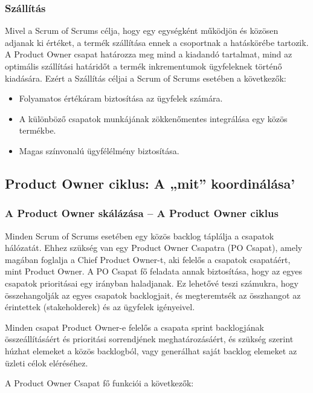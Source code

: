 \documentclass[12pt,a4paper,parskip=full]{scrartcl}
\begin{document}
\subsubsection{Szállítás}\label{Delivery}

Mivel a Scrum of Scrums célja, hogy egy egységként működjön és közösen adjanak ki értéket, a termék szállítása ennek a csoportnak a hatáskörébe tartozik. A Product Owner csapat határozza meg mind a kiadandó tartalmat, mind az optimális szállítási határidőt a termék inkrementumok ügyfeleknek történő kiadására. Ezért a Szállítás céljai a Scrum of Scrums esetében a következők:

\begin{itemize}
\itemsep1pt\parskip0pt
\item
 Folyamatos értékáram biztosítása az ügyfelek számára.
\item
 A különböző csapatok munkájának zökkenőmentes integrálása egy közös termékbe.
\item
 Magas színvonalú ügyfélélmény biztosítása.
\end{itemize}

\subsection{Product Owner ciklus: A „mit” koordinálása'}\label{The-product-owner-cycle}

\subsubsection{A Product Owner skálázása – A Product Owner ciklus}\label{Scaling-the-product-owner}

Minden Scrum of Scrums esetében egy közös backlog táplálja a csapatok hálózatát. Ehhez szükség van egy Product Owner Csapatra (PO Csapat), amely magában foglalja a Chief Product Owner-t, aki felelős a csapatok csapatáért, mint Product Owner. A PO Csapat fő feladata annak biztosítása, hogy az egyes csapatok prioritásai egy irányban haladjanak. Ez lehetővé teszi számukra, hogy összehangolják az egyes csapatok backlogjait, és megteremtsék az összhangot az érintettek (stakeholderek) és az ügyfelek igényeivel.

Minden csapat Product Owner-e felelős a csapata sprint backlogjának összeállításáért és prioritási sorrendjének meghatározásáért, és szükség szerint húzhat elemeket a közös backlogból, vagy generálhat saját backlog elemeket az üzleti célok eléréséhez.

A Product Owner Csapat fő funkciói a következők:
\end{document}
